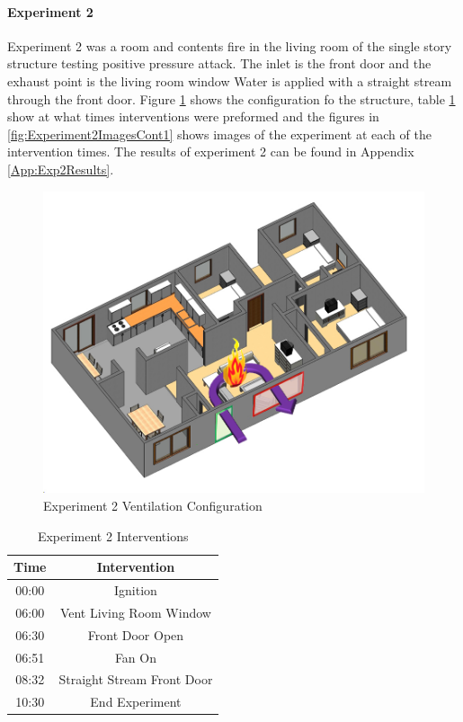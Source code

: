 \documentclass{article}
\begin{document}
\paragraph{Experiment 2}\mbox{}

Experiment 2 was a room and contents fire in the living room of the single story structure testing positive pressure attack. The inlet is the front door and the exhaust point is the living room window Water is applied with a straight stream through the front door. Figure \ref{fig:Exp2VentConfig} shows the configuration fo the structure, table \ref{Table:Exp2Interventions} show at what times interventions were preformed and the figures in \ref{fig:Experiment2ImagesCont1} shows images of the experiment at each of the intervention times. The results of experiment 2 can be found in Appendix \ref{App:Exp2Results}.

\begin{figure}[h!]
	\centering
	\includegraphics[width=5in]{0_Images/FireExperiments/Single_Story/Experiment_2.jpg}
	\caption{Experiment 2 Ventilation Configuration}
	\label{fig:Exp2VentConfig}
\end{figure}

\begin{table}[H]
	\centering
	\caption{Experiment 2 Interventions}
	\begin{tabular}{|c|c|} 
		\hline
		Time & Intervention \\ \hline \hline
		00:00 & Ignition \\ \hline
		06:00 & Vent Living Room Window\\ \hline
		06:30 & Front Door Open \\ \hline
		06:51 & Fan On \\ \hline
		08:32 & Straight Stream Front Door \\ \hline
		10:30 & End Experiment \\ \hline
	\end{tabular}
	\label{Table:Exp2Interventions}
\end{table}
\end{document}
